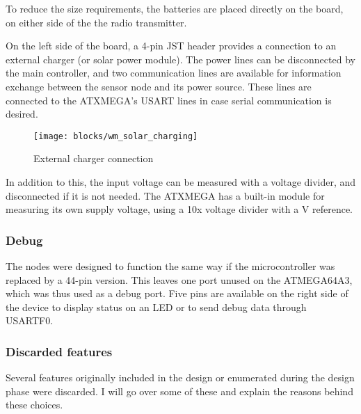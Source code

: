 To reduce the size requirements, the batteries are placed directly on the board,
on either side of the the radio transmitter.

On the left side of the board, a 4-pin JST header provides a connection to an
external charger (or solar power module). The power lines can be disconnected by
the main controller, and two communication lines are available for information
exchange between the sensor node and its power source. These lines are connected
to the ATXMEGA's USART lines in case serial communication is desired.

\begin{figure}[h]
  \begin{center}
    \texttt{[image: blocks/wm\_solar\_charging]}
  \end{center}
  \caption{External charger connection}
  \label{fig:solar-charger}
\end{figure}

In addition to this, the input voltage can be measured with a voltage divider,
and disconnected if it is not needed. The ATXMEGA has a built-in module for
measuring its own supply voltage, using a 10x voltage divider with a \unit[1]{V}
reference.

\subsubsection{Debug}

The nodes were designed to function the same way if the microcontroller was
replaced by a 44-pin version. This leaves one port unused on the ATMEGA64A3,
which was thus used as a debug port. Five pins are available on the right side
of the device to display status on an LED or to send debug data through USARTF0.

\subsubsection{Discarded features}

Several features originally included in the design or enumerated during the
design phase were discarded. I will go over some of these and explain the
reasons behind these choices.


